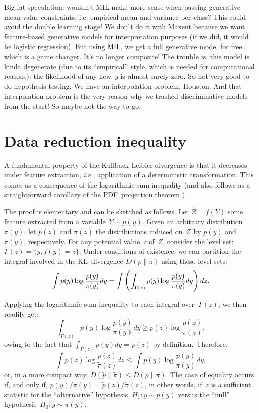 \documentclass[english]{scrartcl}
\begin{document}
{\color{red} Big fat speculation: wouldn't MIL make more sense when passing generative mean-value constraints, i.e. empirical mean and variance per class? This could avoid the double learning stage! We don't do it with Maxent because we want feature-based generative models for interpretation purposes (if we did, it would be logistic regression). But using MIL, we get a full generative model for free... which is a game changer. It's no longer composite! The trouble is, this model is kinda degenerate (due to its ``empirical'' style, which is needed for computational reasons): the likelihood of any new~$y$ is almost surely zero. So not very good to do hypothesis testing. We have an interpolation problem, Houston. And that interpolation problem is the very reason why we trashed discriminative models from the start! So maybe not the way to go.}


\section{Data reduction inequality}
\label{sec:reduction_inequality}

A fundamental property of the Kullback-Leibler divergence is that it decreases under feature extraction, {\em i.e.}, application of a deterministic transformation. This comes as a consequence of the logarithmic sum inequality \cite{Cover-06} (and also follows as a straightforward corollary of the PDF~projection theorem \cite{Minka-04,Baggenstoss-15}). 

The proof is elementary and can be sketched as follows. Let $Z=f(Y)$ some feature extracted from a variable~$Y\sim p(y)$. Given an arbitrary distribution~$\pi(y)$, let  $\tilde{p}(z)$ and $\tilde{\pi}(z)$ the distributions induced on~$Z$ by $p(y)$ and $\pi(y)$, respectively. For any potential value~$z$ of~$Z$, consider the level set: $\Gamma(z)=\{y, f(y)=z\}$. Under conditions of existence, we can partition the integral involved in the KL~divergence $D(p\|\pi)$ using these level sets: 
$$
\int p(y) \log \frac{p(y)}{\pi(y)} dy
=
\int \left( \int_{\Gamma(z)} p(y) \log \frac{p(y)}{\pi(y)} dy \right) dz\\
.
$$

Applying the logarithmic sum inequality \cite{Cover-06} to each integral over~$\Gamma(z)$, we then readily get:
$$
\int_{\Gamma(z)} p(y) \log \frac{p(y)}{\pi(y)} dy
\geq 
\tilde{p}(z) \log \frac{\tilde{p}(z)}{\tilde{\pi}(z)}
,
$$
owing to the fact that $\displaystyle \int_{\Gamma(z)} p(y) dy = \tilde{p}(z)$ by definition. Therefore,
$$
\int \tilde{p}(z) \log \frac{\tilde{p}(z)}{\tilde{\pi}(z)} dz
\leq 
\int p(y) \log \frac{p(y)}{\pi(y)} dy
,
$$
or, in a more compact way, $D(\tilde{p}\|\tilde{\pi})\leq D(p\|\pi)$. The case of equality occurs if, and only if, $p(y)/\pi(y)=\tilde{p}(z)/\tilde{\pi}(z)$, in other words, if~$z$ is a sufficient statistic for the ``alternative'' hypothesis~$H_1:y\sim p(y)$ versus the ``null'' hypothesis~$H_0:y\sim\pi(y)$. 
\end{document}
